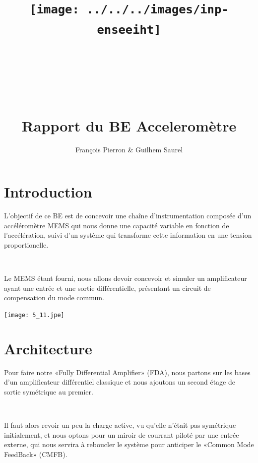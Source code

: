 \documentclass{article}
\title{\texttt{[image: ../../../images/inp-enseeiht]} \\ ~ \\ ~ \\ ~ \\ ~ \\ Rapport du BE Acceleromètre}
\author{François Pierron \& Guilhem Saurel}
\date{\oldstylenums{3 février 2014}}
\begin{document}
\begin{titlepage}
    \setcounter{page}{0}
    \maketitle
    \vfill
    \tableofcontents
    \thispagestyle{empty}
\end{titlepage}

\section*{Introduction}

L’objectif de ce BE est de concevoir une chaîne d’instrumentation composée d’un accéléromètre MEMS qui nous donne une capacité variable en fonction de l’accélération, suivi d’un système qui transforme cette information en une tension proportionelle.

~

Le MEMS étant fourni, nous allons devoir concevoir et simuler un amplificateur ayant une entrée et une sortie différentielle, présentant un circuit de compensation du mode commun.


\texttt{[image: 5\_11.jpe]}

\section{Architecture}

Pour faire notre «Fully Differential Amplifier» (FDA), nous partons sur les bases d’un amplificateur différentiel classique et nous ajoutons un second étage de sortie symétrique au premier.

~

Il faut alors revoir un peu la charge active, vu qu’elle n’était pas symétrique initialement, et nous optons pour un miroir de courrant piloté par une entrée externe, qui nous servira à reboucler le système pour anticiper le «Common Mode FeedBack» (CMFB).
\end{document}
